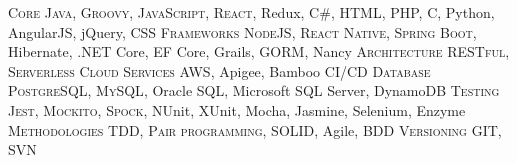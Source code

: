 %
%
%

	\begin{scholarship}
		\scholarshipentry
			{\textsc{Core}}
			{\textsc{Java}, \textsc{Groovy}, \textsc{JavaScript}, \textsc{React}, Redux, C\#, HTML, PHP, C, Python, AngularJS, jQuery, CSS}
		\scholarshipentry
			{\textsc{Frameworks}}
			{\textsc{NodeJS}, \textsc{React Native}, \textsc{Spring Boot}, Hibernate, .NET Core, EF Core, Grails, GORM, Nancy}
		\scholarshipentry
			{\textsc{Architecture}}
			{\textsc{RESTful}, \textsc{Serverless}}
		\scholarshipentry
			{\textsc{Cloud Services}}
			{\textsc{AWS}, Apigee, Bamboo CI/CD}
		\scholarshipentry
			{\textsc{Database}}
			{\textsc{PostgreSQL}, \textsc{MySQL}, Oracle SQL, Microsoft SQL Server, DynamoDB}
		\scholarshipentry
			{\textsc{Testing}}
			{\textsc{Jest}, \textsc{Mockito}, \textsc{Spock}, NUnit, XUnit, Mocha, Jasmine, Selenium, Enzyme}
		\scholarshipentry
			{\textsc{Methodologies}}
			{\textsc{TDD}, \textsc{Pair programming}, \textsc{SOLID}, Agile, BDD}
		\scholarshipentry
			{\textsc{Versioning}}
			{\textsc{GIT}, SVN}
	\end{scholarship}